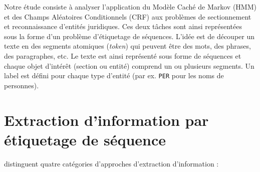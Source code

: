 Notre étude consiste à analyser l'application du Modèle Caché de Markov (HMM) et des Champs Aléatoires Conditionnels (CRF) aux problèmes de sectionnement et reconnaissance d'entités juridiques. Ces deux tâches sont ainsi représentées sous la forme d'un problème d'étiquetage de séquences. L'idée est de découper un texte en des segments atomiques (\textit{token}) qui peuvent être des mots, des phrases, des paragraphes, etc. Le texte est ainsi représenté sous forme de séquences et chaque objet d'intérêt (section ou entité) comprend  un ou plusieurs segments. Un label est défini pour chaque type d'entité (par ex. \verb|PER| pour les noms de personnes). 


\section{Extraction d'information par étiquetage de séquence}
\label{sec:structuration:biblio}

\citet{chau2002nerwithNN} distinguent quatre catégories d'approches d'extraction d'information :

